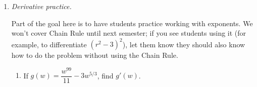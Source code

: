 \documentclass{article}
\providecommand{\check}{}
\renewcommand{\check}{\ifmmode{\text{ \ding{51} }}\else{\ding{51} }\fi}
\begin{document}
\begin{enumerate}
\begin{enumerate}
\begin{solution}
    \end{solution}

  \item
    \begin{problem}[\stretch{4}]
      Use your answers to the previous parts to sketch a graph of $f$. 
    \end{problem}

    \begin{solution}
    
    \end{solution}

  \item
    \begin{problem}
      \check Graphing involves putting a lot of information together, and it's easy to miss something on a first attempt. So, it's a good habit to always go back and check that the graph you sketched agrees with everything you've found out. Do that now!
    \end{problem}

  \end{enumerate}

\item  \emph{Derivative practice.}

  \begin{workshop}
    Part of the goal here is to have students practice working with exponents. We won't cover Chain Rule until next semester; if you see students using it (for example, to differentiate $(r^2 - 3)^2$), let them know they should also know how to do the problem without using the Chain Rule.
  \end{workshop}

  \begin{enumerate}

  \item
    \begin{problem}[\stretch{0.5}]
      If $g(w) = \dfrac{w^{99}}{11} - 3 w^{5/3}$, find $g'(w)$. 
    \end{problem}


\end{enumerate}
\end{enumerate}
\end{document}
